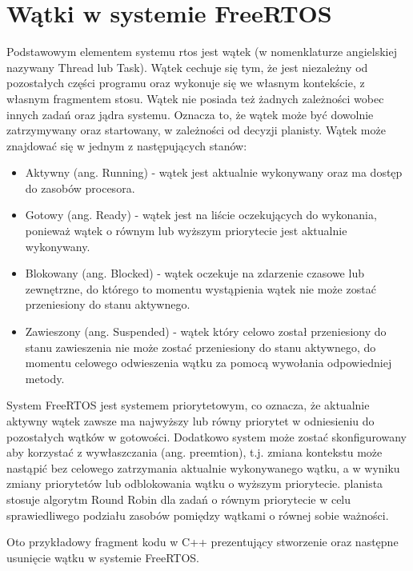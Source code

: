 \section{Wątki w systemie FreeRTOS}
Podstawowym elementem systemu \gls{rtos} jest wątek (w nomenklaturze angielskiej nazywany Thread lub Task).
Wątek cechuje się tym, że jest niezależny od pozostałych części programu oraz wykonuje się we własnym kontekście,
z własnym fragmentem stosu\cite{freertosbook}.
Wątek nie posiada też żadnych zależności wobec innych zadań oraz jądra systemu. Oznacza to, że wątek może być dowolnie
zatrzymywany oraz startowany, w zależności od decyzji planisty.
Wątek może znajdować się w jednym z następujących stanów\cite{freertosdocs}:
\begin{itemize}
      \item Aktywny (ang. Running) - wątek jest aktualnie wykonywany oraz ma dostęp do zasobów procesora.
      \item Gotowy (ang. Ready) - wątek jest na liście oczekujących do wykonania, ponieważ wątek o równym lub wyższym
            priorytecie jest aktualnie wykonywany.
      \item Blokowany (ang. Blocked) - wątek oczekuje na zdarzenie czasowe lub zewnętrzne, do którego to momentu wystąpienia
            wątek nie może zostać przeniesiony do stanu aktywnego.
      \item Zawieszony (ang. Suspended) - wątek który celowo został przeniesiony do stanu zawieszenia nie może zostać przeniesiony
            do stanu aktywnego, do momentu celowego odwieszenia wątku za pomocą wywołania odpowiedniej metody.
\end{itemize}

System FreeRTOS jest systemem priorytetowym, co oznacza, że aktualnie aktywny wątek zawsze ma najwyższy lub równy priorytet
w odniesieniu do pozostałych wątków w gotowości\cite{freertosbook}. Dodatkowo system może zostać skonfigurowany
aby korzystać z wywłaszczania (ang. preemtion), t.j. zmiana kontekstu może nastąpić bez celowego zatrzymania aktualnie
wykonywanego wątku, a w wyniku zmiany priorytetów lub odblokowania wątku o wyższym priorytecie. \Gls{planista} stosuje algorytm
Round Robin dla zadań o równym priorytecie w celu sprawiedliwego podziału zasobów pomiędzy wątkami o równej sobie ważności.

Oto przykładowy fragment kodu w C++ prezentujący stworzenie oraz następne usunięcie wątku w systemie FreeRTOS.


